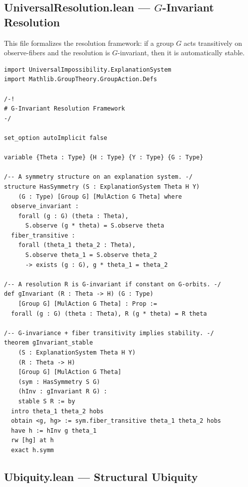 \documentclass[11pt,a4paper]{article}
\begin{document}
\subsection[UniversalResolution.lean --- G-Invariant Resolution]{UniversalResolution.lean --- $G$-Invariant Resolution}
\label{app:lean-resolution}

This file formalizes the resolution framework: if a group $G$ acts transitively
on observe-fibers and the resolution is $G$-invariant, then it is automatically
stable.

\begin{lstlisting}[caption={UniversalResolution.lean --- complete file},label={lst:resolution}]
import UniversalImpossibility.ExplanationSystem
import Mathlib.GroupTheory.GroupAction.Defs

/-!
# G-Invariant Resolution Framework
-/

set_option autoImplicit false

variable {Theta : Type} {H : Type} {Y : Type} {G : Type}

/-- A symmetry structure on an explanation system. -/
structure HasSymmetry (S : ExplanationSystem Theta H Y)
    (G : Type) [Group G] [MulAction G Theta] where
  observe_invariant :
    forall (g : G) (theta : Theta),
      S.observe (g * theta) = S.observe theta
  fiber_transitive :
    forall (theta_1 theta_2 : Theta),
      S.observe theta_1 = S.observe theta_2
      -> exists (g : G), g * theta_1 = theta_2

/-- A resolution R is G-invariant if constant on G-orbits. -/
def gInvariant (R : Theta -> H) (G : Type)
    [Group G] [MulAction G Theta] : Prop :=
  forall (g : G) (theta : Theta), R (g * theta) = R theta

/-- G-invariance + fiber transitivity implies stability. -/
theorem gInvariant_stable
    (S : ExplanationSystem Theta H Y)
    (R : Theta -> H)
    [Group G] [MulAction G Theta]
    (sym : HasSymmetry S G)
    (hInv : gInvariant R G) :
    stable S R := by
  intro theta_1 theta_2 hobs
  obtain <g, hg> := sym.fiber_transitive theta_1 theta_2 hobs
  have h := hInv g theta_1
  rw [hg] at h
  exact h.symm
\end{lstlisting}

\subsection{Ubiquity.lean --- Structural Ubiquity}
\label{app:lean-ubiquity}
\end{document}

